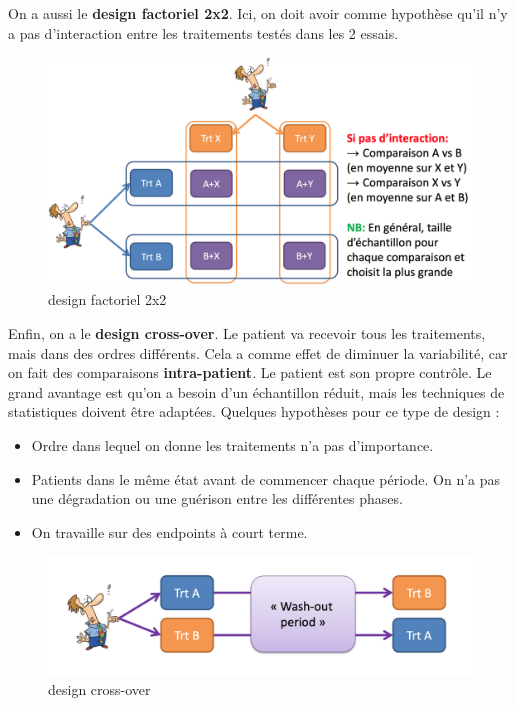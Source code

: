 On a aussi le \textbf{design factoriel 2x2}. Ici, on doit avoir comme hypothèse qu'il n'y a pas d'interaction entre les traitements testés dans les 2 essais.
\begin{figure}[H]
    \centering
    \includegraphics[scale = 0.2]{images/parallel.png}
    \caption{design factoriel 2x2}
    \label{fig:designfactoriel}
\end{figure}

Enfin, on a le \textbf{design cross-over}. Le patient va recevoir tous les traitements, mais dans des ordres différents. Cela a comme effet de diminuer la variabilité, car on fait des comparaisons \textbf{intra-patient}. Le patient est son propre contrôle. Le grand avantage est qu'on a besoin d'un échantillon réduit, mais les techniques de statistiques doivent être adaptées. 
Quelques hypothèses pour ce type de design :
\begin{itemize}
    \item Ordre dans lequel on donne les traitements n'a pas d'importance.
    \item Patients dans le même état avant de commencer chaque période. On n'a pas une dégradation ou une guérison entre les différentes phases.
    \item On travaille sur des endpoints à court terme. 
\end{itemize}


\begin{figure}[H]
    \centering
    \includegraphics[scale =0.2]{images/overcrossing.png}
    \caption{design cross-over}
    \label{fig:my_label}
\end{figure}



